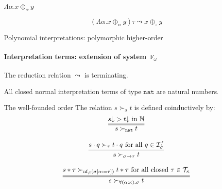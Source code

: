 \documentclass[10pt,presentation,color=names]{beamer}
\newcommand{\Fomega}{\mathtt{F}_\omega}
\newcommand{\Iterms}{\mathcal{I}}
\newcommand{\arrtype}{\rightarrow}
\newcommand{\app}[2]{#1 \cdot #2}
\newcommand{\tapp}[2]{#1 * #2}
\newcommand{\subst}[2]{#1:=#2}
\newcommand{\nat}{\mathtt{nat}}
\newcommand{\Tc}{\mathcal{T}}
\newcommand{\nf}{\mathrm{nf}}
\newcommand{\da}{\mathord{\downarrow}}
\begin{document}

\begin{frame}[noframenumbering]
  \begin{center}
    $\Lambda \alpha . x \oplus_\alpha y$
  \end{center}
  \pause
  \bigskip
  \[
  (\Lambda \alpha . x \oplus_\alpha y) \tau \leadsto x \oplus_\tau y
  \]
\end{frame}


\begin{frame}{Polynomial interpretations: polymorphic higher-order}
  \framesubtitle{Interpretation terms: extension of system~$\Fomega$}
  \begin{theorem}
    The reduction relation $\leadsto$ is terminating.
  \end{theorem}
  \pause
  \begin{corollary}
    All closed normal interpretation terms of type $\nat$ are natural
    numbers.
  \end{corollary}
\end{frame}

\begin{frame}{The well-founded order}
  The relation $s \succ_{\sigma} t$ is defined coinductively by:
  \[
  \begin{array}{c}
    \infer={s \succ_\nat t}{s\da > t\da \text{ in }\mathbb{N}} \\ \\
    \infer={s \succ_{\sigma\arrtype\tau} t}{\app{s}{q} \succ_{\tau} \app{t}{q} \text{ for all } q \in \Iterms^f_\sigma} \\ \\
    \infer={s \succ_{\forall(\alpha:\kappa).\sigma} t}{\tapp{s}{\tau} \succ_{\nf_\beta(\sigma[\subst{\alpha}{\tau}])} \tapp{t}{\tau} \text{ for all closed } \tau \in \Tc_{\kappa}}
  \end{array}
  \]


\end{frame}
\end{document}

